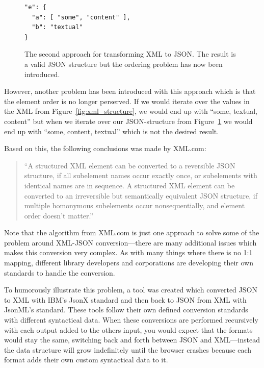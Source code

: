 \documentclass{cslthse-msc}
\begin{document}
\begin{figure}[H]
  \centering
    \begin{center}
\begin{lstlisting}[breaklines=true,frame=single]
"e": {
  "a": [ "some", "content" ],
  "b": "textual"
}
\end{lstlisting}
    \end{center}
  \caption{The second approach for transforming XML to JSON. The result is a valid JSON structure but the ordering problem has now been introduced.}
  \label{fig:json_wrong}
\end{figure}

However, another problem has been introduced with this approach which is that the element order is no longer perserved. If we would iterate over the values in the XML from Figure~\ref{fig:xml_structure}, we would end up with \enquote{some, textual, content} but when we iterate over our JSON-structure from Figure~\ref{fig:json_wrong} we would end up with \enquote{some, content, textual} which is not the desired result.

\vspace{5mm}
\noindent Based on this, the following conclusions was made by XML.com:

\begin{quote}

\enquote{A structured XML element can be converted to a reversible JSON structure, if all subelement names occur exactly once, or subelements with identical names are in sequence. A structured XML element can be converted to an irreversible but semantically equivalent JSON structure, if multiple homonymous subelements occur nonsequentially, and element order doesn't matter.} \cite{xml_json}

\end{quote}

Note that the algorithm from XML.com is just one approach to solve some of the problem around XML-JSON conversion---there are many additional issues which makes this conversion very complex. As with many things where there is no 1:1 mapping, different library developers and corporations are developing their own standards to handle the conversion.

To humorously illustrate this problem, a tool was created\cite{jsonx_jsonml} which converted JSON to XML with IBM's JsonX standard and then back to JSON from XML with JsonML's\cite{jsonml} standard. These tools follow their own defined conversion standards with different syntactical data. When these conversions are performed recursively with each output added to the others input, you would expect that the formats would stay the same, switching back and forth between JSON and XML---instead the data structure will grow indefinitely until the browser crashes because each format adds their own custom syntactical data to it.
\end{document}
